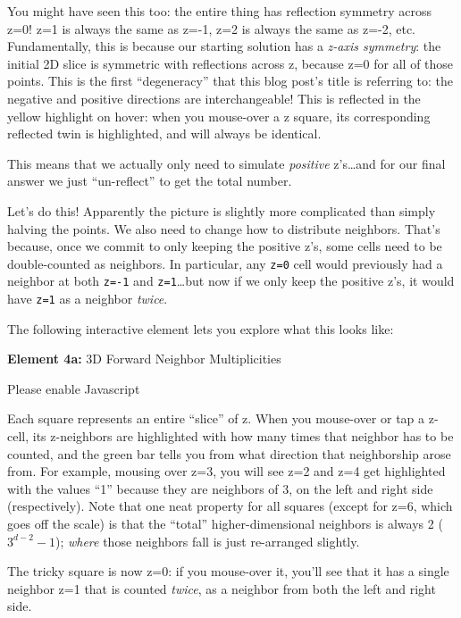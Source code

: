 \documentclass[]{article}
\begin{document}
You might have seen this too: the entire thing has reflection symmetry across
z=0! z=1 is always the same as z=-1, z=2 is always the same as z=-2, etc.
Fundamentally, this is because our starting solution has a \emph{z-axis
symmetry}: the initial 2D slice is symmetric with reflections across z, because
z=0 for all of those points. This is the first ``degeneracy'' that this blog
post's title is referring to: the negative and positive directions are
interchangeable! This is reflected in the yellow highlight on hover: when you
mouse-over a z square, its corresponding reflected twin is highlighted, and will
always be identical.

This means that we actually only need to simulate \emph{positive} z's\ldots and
for our final answer we just ``un-reflect'' to get the total number.

Let's do this! Apparently the picture is slightly more complicated than simply
halving the points. We also need to change how to distribute neighbors. That's
because, once we commit to only keeping the positive z's, some cells need to be
double-counted as neighbors. In particular, any \texttt{z=0} cell would
previously had a neighbor at both \texttt{z=-1} and \texttt{z=1}\ldots but now
if we only keep the positive z's, it would have \texttt{z=1} as a neighbor
\emph{twice}.

The following interactive element lets you explore what this looks like:

\leavevmode\hypertarget{golSyms3DForward}{}%
\textbf{Element 4a:} 3D Forward Neighbor Multiplicities

\leavevmode\hypertarget{golSyms3DForwardCont}{}%
Please enable Javascript

Each square represents an entire ``slice'' of z. When you mouse-over or tap a
z-cell, its z-neighbors are highlighted with how many times that neighbor has to
be counted, and the green bar tells you from what direction that neighborship
arose from. For example, mousing over z=3, you will see z=2 and z=4 get
highlighted with the values ``1'' because they are neighbors of 3, on the left
and right side (respectively). Note that one neat property for all squares
(except for z=6, which goes off the scale) is that the ``total''
higher-dimensional neighbors is always 2 (\(3^{d-2}-1\)); \emph{where} those
neighbors fall is just re-arranged slightly.

The tricky square is now z=0: if you mouse-over it, you'll see that it has a
single neighbor z=1 that is counted \emph{twice}, as a neighbor from both the
left and right side.
\end{document}
